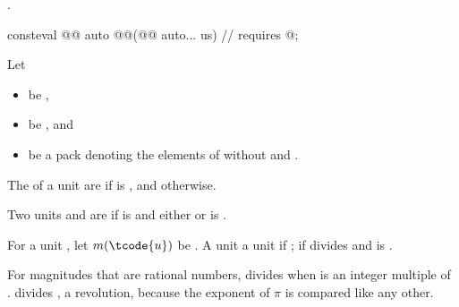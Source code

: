 \begin{itemdescr}
\pnum
\returns
{}.
\end{itemdescr}

\begin{itemdecl}
consteval @@ auto @@(@@ auto... us)  // \expos
  requires @\seebelownc@;
\end{itemdecl}

\begin{itemdescr}
\pnum
Let
\begin{itemize}
\item
{} be ,
\item
{} be , and
\item
{} be a pack denoting the elements of  without  and .
\end{itemize}

\pnum
The  of a unit  are
 if  is , and  otherwise.

\pnum
Two units  and  are  if
 is  and either
 or
 is .

\pnum
For a unit , let $m(\tcode{u})$ be .
A unit   a unit  if
;
   if  divides 
and  is .
\begin{note}
For magnitudes that are rational numbers,  divides  when
 is an integer multiple of .
 divides , a revolution,
because the exponent of $\pi$ is compared like any other.
\end{note}


\end{itemdescr}
